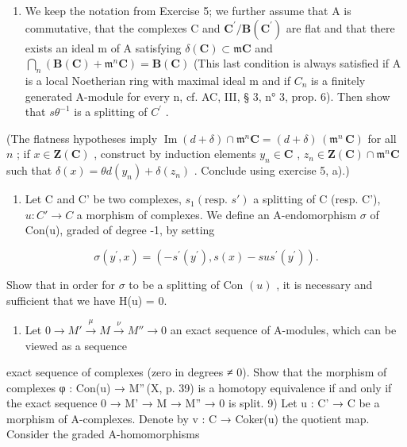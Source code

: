 \begin{enumerate}
\def\labelenumi{\arabic{enumi})}
\setcounter{enumi}{5}
\tightlist
\item
  We keep the notation from Exercise 5; we further assume that A is commutative, that the complexes C and \(\mathbf{C}^{\prime}/\mathbf{B}(\mathbf{C}^{\prime})\) are flat and that there exists an ideal m of A satisfying \(\delta(\mathbf{C}) \subset \mathfrak{m}\mathbf{C}\) and \(\bigcap_{n} (\mathbf{B}(\mathbf{C}) + \mathfrak{m}^{n}\mathbf{C}) = \mathbf{B}(\mathbf{C})\) (This last condition is always satisfied if A is a local Noetherian ring with maximal ideal m and if \(C_{n}\) is a finitely generated A-module for every n, cf. AC, III, § 3, n° 3, prop. 6). Then show that \(s\theta^{-1}\) is a splitting of \(C^{\prime}\) .
\end{enumerate}

(The flatness hypotheses imply \(\operatorname{Im}(d + \delta) \cap \mathfrak{m}^n\mathbf{C} = (d + \delta)\, (\mathfrak{m}^n\,\mathbf{C})\) for all \(n\) ; if \(x \in \mathbf{Z}(\mathbf{C})\) , construct by induction elements \(y_n \in \mathbf{C}\) , \(z_n \in \mathbf{Z}(\mathbf{C}) \cap \mathfrak{m}^n\mathbf{C}\) such that \(\delta(x) = \theta d(y_n) + \delta(z_n)\) . Conclude using exercise 5, a).)

\begin{enumerate}
\def\labelenumi{\arabic{enumi})}
\setcounter{enumi}{6}
\tightlist
\item
  Let C and C' be two complexes, \(s_{1}(\text{resp. } s')\) a splitting of C (resp. C'), \(u : C' \to C\) a morphism of complexes. We define an A-endomorphism \(\sigma\) of Con(u), graded of degree -1, by setting
\end{enumerate}

\[
\sigma (y ^ {\prime}, x) = \left(- s ^ {\prime} (y ^ {\prime}), s (x) - s u s ^ {\prime} (y ^ {\prime})\right).
\]

Show that in order for \(\sigma\) to be a splitting of Con \((u)\) , it is necessary and sufficient that we have H(u) = 0.

\begin{enumerate}
\def\labelenumi{\arabic{enumi})}
\setcounter{enumi}{7}
\tightlist
\item
  Let \(0 \to M' \xrightarrow{\mu} M \xrightarrow{\nu} M'' \to 0\) an exact sequence of A-modules, which can be viewed as a sequence
\end{enumerate}

exact sequence of complexes (zero in degrees ≠ 0). Show that the morphism of complexes φ : Con(u) → M''\,(X, p. 39) is a homotopy equivalence if and only if the exact sequence 0 → M' → M → M'' → 0 is split. 9) Let u : C' → C be a morphism of A-complexes. Denote by v : C → Coker(u) the quotient map. Consider the graded A-homomorphisms

